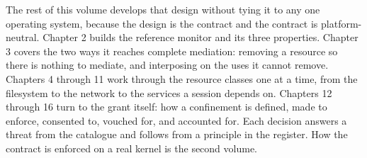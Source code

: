 The rest of this volume develops that design without tying it to any one
operating system, because the design is the contract and the contract is
platform-neutral. Chapter 2 builds the reference monitor and its three
properties. Chapter 3 covers the two ways it reaches complete mediation:
removing a resource so there is nothing to mediate, and interposing on
the uses it cannot remove. Chapters 4 through 11 work through the
resource classes one at a time, from the filesystem to the network to
the services a session depends on. Chapters 12 through 16 turn to the
grant itself: how a confinement is defined, made to enforce, consented
to, vouched for, and accounted for. Each decision answers a threat from
the catalogue and follows from a principle in the register. How the
contract is enforced on a real kernel is the second volume.
